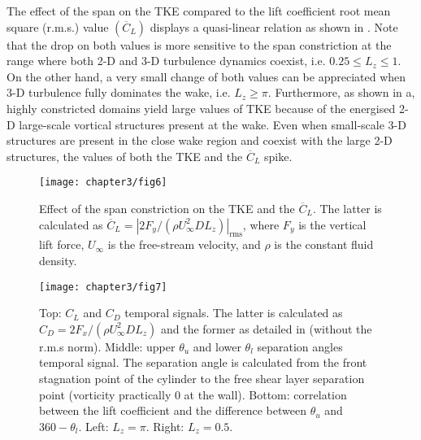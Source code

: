 \documentclass[../main.tex]{subfiles}
\begin{document}
The effect of the span on the TKE compared to the lift coefficient root mean square (r.m.s.) value $(\overline{C}_L)$ displays a quasi-linear relation as shown in .
Note that the drop on both values is more sensitive to the span constriction at the range where both 2-D and 3-D turbulence dynamics coexist, i.e. $0.25\le L_z\le1$.
On the other hand, a very small change of both values can be appreciated when 3-D turbulence fully dominates the wake, i.e. $L_z\ge\pi$.
Furthermore, as shown in a, highly constricted domains yield large values of TKE because of the energised 2-D large-scale vortical structures present at the wake.
Even when small-scale 3-D structures are present in the close wake region and coexist with the large 2-D structures, the values of both the TKE and the $\overline{C}_L$ spike.

\begin{figure}
 \vspace*{0.3cm}
  \centerline{\texttt{[image: chapter3/fig6]}}
  \caption{Effect of the span constriction on the TKE and the $\overline{C}_L$.
The latter is calculated as $\overline{C}_L=|2F_y/(\rho U_\infty^2 D L_z)|_{\mathrm{rms}}$, where $F_y$ is the vertical lift force, $U_\infty$ is the free-stream velocity, and $\rho$ is the constant fluid density.}
\label{fig:TKE_CL}
\end{figure}

\begin{figure}
	\vspace*{0.3cm}
  \centerline{\texttt{[image: chapter3/fig7]}}
  \caption{Top: $C_L$ and $C_D$ temporal signals.
The latter is calculated as $C_D=2F_x/(\rho U_\infty^2 D L_z)$ and the former as detailed in  (without the r.m.s norm).
Middle: upper $\theta_u$ and lower $\theta_l$ separation angles temporal signal.
The separation angle is calculated from the front stagnation point of the cylinder to the free shear layer separation point (vorticity practically 0 at the wall).
Bottom: correlation between the lift coefficient and the difference between $\theta_u$ and $360-\theta_l$.
Left: $L_z=\pi$.
Right: $L_z=0.5$.}
\label{fig:separation}
\end{figure}
\end{document}
